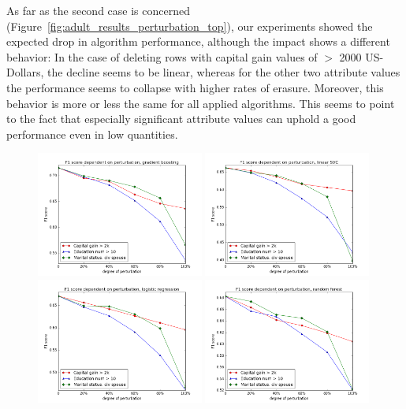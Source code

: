 \documentclass{llncs}
\begin{document}
As far as the second case is concerned (Figure~\ref{fig:adult_results_perturbation_top}), our experiments showed the expected drop in algorithm performance, although the impact shows a different behavior: In the case of deleting rows with capital gain values of $>$ 2000 US-Dollars, the decline seems to be linear, whereas for the other two attribute values the performance seems to collapse with higher rates of erasure. Moreover, this behavior is more or less the same for all applied algorithms. This seems to point to the fact that especially significant attribute values can uphold a good performance even in low quantities.


\begin{figure}[!t]
	\begin{center}
		\includegraphics[width=0.49\textwidth]{figures/results/perturb_gradient_boost}
		\includegraphics[width=0.49\textwidth]{figures/results/perturb_linear_svc}
		\includegraphics[width=0.49\textwidth]{figures/results/perturb_logistic_regression}
		\includegraphics[width=0.49\textwidth]{figures/results/perturb_random_forest}

\end{center}
\end{figure}
\end{document}

